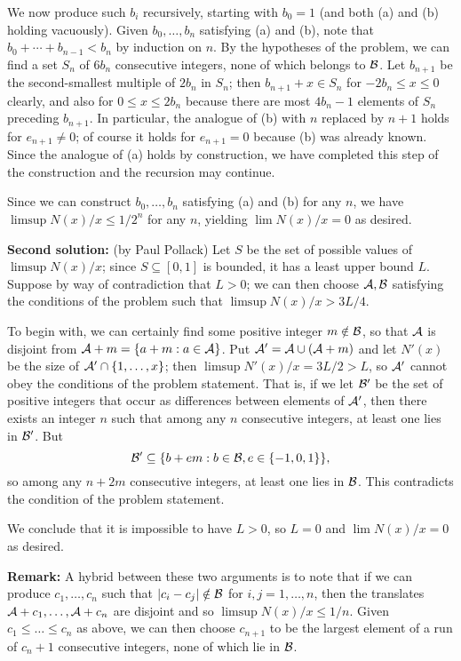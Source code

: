 \documentclass[amssymb,twocolumn,pra,10pt,aps]{revtex4-1}
\begin{document}
\begin{itemize}
We now produce such $b_i$ recursively, starting with $b_0 = 1$ (and both
(a) and (b) holding vacuously).  Given $b_0, \dots, b_n$ satisfying (a)
and (b), note that $b_0 + \cdots + b_{n-1} < b_n$ by induction on $n$.
By the hypotheses of the problem, we can find a set $S_n$ of $6b_n$
consecutive integers, none of which belongs to $\mathcal{B}$. Let $b_{n+1}$
be the second-smallest multiple of $2b_n$ in $S_n$; then $b_{n+1} + x \in
S_n$ for $-2b_n \leq x \leq 0$ clearly, and also for $0 \leq x \leq 2b_n$
because there are most $4b_n-1$ elements of $S_n$ preceding $b_{n+1}$.
In particular, the analogue of (b) with $n$ replaced by $n+1$ holds for
$e_{n+1} \neq 0$; of course it holds for $e_{n+1} = 0$ because (b) was
already known. Since the analogue of (a) holds by construction, we have
completed this step of the construction and the recursion may continue.

Since we can construct $b_0, \dots, b_n$ satisfying (a) and (b) for any $n$,
we have $\limsup N(x)/x \leq 1/2^n$ for any $n$, yielding $\lim N(x)/x =
0$ as desired.

\textbf{Second solution:} (by Paul Pollack)
Let $S$ be the set of possible values of $\limsup N(x)/x$;
since $S \subseteq [0,1]$ is bounded, it has a least upper bound $L$.
Suppose by way of contradiction that $L>0$;
we can then choose $\mathcal{A}, \mathcal{B}$ satisfying the conditions of the problem such
that $\limsup N(x)/x > 3L/4$.

To begin with, we can
certainly find some positive integer $m \notin \mathcal{B}$, so that
$\mathcal{A}$ is disjoint from $\mathcal{A} + m = \{a +m: a \in \mathcal{A}\}$.
Put $\mathcal{A}' = \mathcal{A} \cup (\mathcal{A} + m)$ and let
$N'(x)$ be the size of $\mathcal{A}' \cap \{1, \dots, x\}$; then
$\limsup N'(x)/x = 3L/2 > L$, so $\mathcal{A}'$ cannot obey the conditions
of the problem statement. That is, if we let $\mathcal{B}'$ be the set of positive
integers that occur as differences between elements of $\mathcal{A}'$,
then there exists an integer $n$ such that among any $n$ consecutive
integers, at least one lies in $\mathcal{B}'$.
But
\[
\mathcal{B}' \subseteq \{b + em: b \in \mathcal{B}, e \in \{-1,0,1\}\},
\]
so among any $n+2m$ consecutive integers, at least one lies in $\mathcal{B}$.
This contradicts the condition of the problem statement.

We conclude that it is impossible to have $L>0$, so $L = 0$
and $\lim N(x)/x = 0$ as desired.

\textbf{Remark:} A hybrid between these two arguments is to
note that if we can produce $c_1, \dots, c_n$ such that
$|c_i - c_j| \notin \mathcal{B}$ for $i,j = 1, \dots, n$, then
the translates $\mathcal{A} + c_1, \dots, \mathcal{A} + c_n$ are disjoint
and so $\limsup N(x)/x \leq 1/n$. Given $c_1 \leq \dots \leq c_n$
as above, we can then choose $c_{n+1}$ to be the largest element of a
run of $c_n+1$ consecutive integers, none of which lie in $\mathcal{B}$.

\end{itemize}
\end{document}
